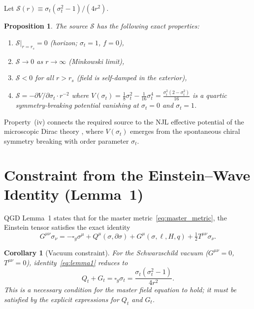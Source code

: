 \documentclass[11pt,a4paper]{article}
\theoremstyle{plain}
\newtheorem{corollary}[theorem]{Corollary}
\newtheorem{proposition}[theorem]{Proposition}
\theoremstyle{definition}
\newcommand{\sig}{\sigma}
\newcommand{\sigt}{\sigma_t}
\newcommand{\rs}{r_s}
\newcommand{\boxg}{\square_g}
\newcommand{\Qt}{Q_t}
\newcommand{\Gt}{G_t}
\newcommand{\half}{\tfrac{1}{2}}
\begin{document}
Let $\mathcal{S}(r) \equiv \sigt(\sigt^2-1)/(4r^2)$.

\begin{proposition}\label{prop:source_props}
The source $\mathcal{S}$ has the following exact properties:
\begin{enumerate}
  \item[\rm(i)] $\mathcal{S}\big|_{r=\rs} = 0$ (horizon; $\sigt=1$, $f=0$),
  \item[\rm(ii)] $\mathcal{S} \to 0$ as $r\to\infty$ (Minkowski limit),
  \item[\rm(iii)] $\mathcal{S} < 0$ for all $r > \rs$ (field is self-damped in the exterior),
  \item[\rm(iv)] $\mathcal{S} = -\partial V/\partial\sigt \cdot r^{-2}$
    where $V(\sigt) = \tfrac{1}{8}\sigt^2 - \tfrac{1}{16}\sigt^4 = \tfrac{\sigt^2(2-\sigt^2)}{16}$ is a quartic
    symmetry-breaking potential vanishing at $\sigt = 0$ and $\sigt = 1$.
\end{enumerate}
\end{proposition}

Property~(iv) connects the required source to the NJL effective
potential of the microscopic Dirac theory \cite{matshaba2026:kin},
where $V(\sigt)$ emerges from the spontaneous chiral symmetry breaking
with order parameter $\sigt$.

\section{Constraint from the Einstein--Wave Identity (Lemma~1)}

QGD Lemma~1 \cite{matshaba2026:ch3} states that for the master
metric~\eqref{eq:master_metric}, the Einstein tensor satisfies the
exact identity
\begin{equation}\label{eq:lemma1}
  G^{\mu\nu}\sig_\nu = -\boxg\sig^\mu
    + Q^\mu(\sig,\partial\sig)
    + G^\mu(\sig,\ell,H,q)
    + \half T^{\mu\nu}\sig_\nu.
\end{equation}

\begin{corollary}[Vacuum constraint]\label{cor:vacuum}
For the Schwarzschild vacuum ($G^{\mu\nu} = 0$, $T^{\mu\nu} = 0$),
identity~\eqref{eq:lemma1} reduces to
\begin{equation}\label{eq:vacuum_constraint}
  \Qt + \Gt = \boxg\sigt = \frac{\sigt(\sigt^2-1)}{4r^2}.
\end{equation}
This is a necessary condition for the master field equation to
hold; it must be satisfied by the explicit expressions for $Q_t$
and $G_t$.
\end{corollary}
\end{document}
